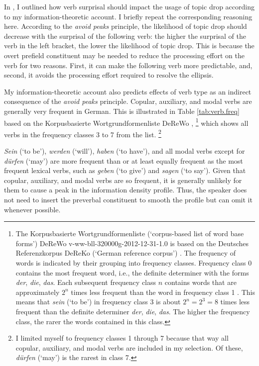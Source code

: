 In , I outlined how verb surprisal should impact the usage of topic drop according to my information-theoretic account.
I briefly repeat the corresponding reasoning here.
According to the \textit{avoid peaks} principle, the likelihood of topic drop should decrease with the surprisal of the following verb:
the higher the surprisal of the verb in the left bracket, the lower the likelihood of topic drop. 
This is because the overt prefield constituent may be needed to reduce the processing effort  on the verb for two reasons.
First, it can make the following verb more predictable,  and, second, it avoids the processing effort  required to resolve the ellipsis.

   
My information-theoretic account also predicts effects of verb type as an indirect consequence of the \textit{avoid peaks} principle.
Copular, auxiliary, and modal verbs are generally very frequent in German. 
This is illustrated in Table \ref{tab:verb.freq} based on the Korpusbasierte  Wortgrundformenliste DeReWo \citep{derewo2013},%
\footnote{\label{note:wortgrundformliste}The Korpusbasierte Wortgrundformenliste (`corpus-based list of word base forms') DeReWo v-ww-bll-320000g-2012-12-31-1.0 \citep{derewo2013} is based on the Deutsches Referenzkorpus DeReKo (`German reference corpus') \citep{dereko2012}.
The frequency of words is indicated by their grouping into frequency classes.
Frequency class 0 contains the most frequent word, i.e., the definite determiner with the forms \textit{der}, \textit{die}, \textit{das}. 
Each subsequent frequency class $n$ contains words that are approximately $2^n$ times less frequent than the word in frequency class 1 \citep[7]{derewo2013.doku}.
This means that \textit{sein} (`to be') in frequency class 3  is about $2^n = 2^3 = 8$ times less frequent than the definite determiner \textit{der}, \textit{die}, \textit{das}.
The higher the frequency class, the rarer the words contained in this class.}
%
which shows all verbs in the frequency classes 3 to 7 from the list.%
\footnote{I limited myself to frequency classes 1 through 7 because that way all copular, auxiliary, and modal verbs are included in my selection.
Of these, \textit{dürfen} (`may') is the rarest in class 7.}



\textit{Sein} (`to be'), \textit{werden} (`will'), \textit{haben} (`to have'), and all modal verbs except for \textit{dürfen} (`may') are more frequent than or at least equally frequent as the most frequent lexical verbs, such as \textit{geben} (`to give') and \textit{sagen} (`to say').
Given that copular, auxiliary, and modal verbs are so frequent, it is generally unlikely for them to cause a peak in the information density profile.
Thus, the speaker does not need to insert the preverbal constituent to smooth the profile but can omit it whenever possible.

